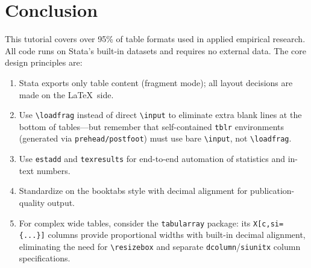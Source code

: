 \documentclass[11pt]{article}
\numberwithin{table}{section}
\begin{document}
\section{Conclusion}
This tutorial covers over 95\% of table formats used in applied empirical research. All code runs on Stata's built-in datasets and requires no external data. The core design principles are:
\begin{enumerate}
    \item Stata exports only table content (fragment mode); all layout decisions are made on the \LaTeX\ side.
    \item Use \texttt{\textbackslash loadfrag} instead of direct \texttt{\textbackslash input} to eliminate extra blank lines at the bottom of tables---but remember that self-contained \texttt{tblr} environments (generated via \texttt{prehead/postfoot}) must use bare \texttt{\textbackslash input}, not \texttt{\textbackslash loadfrag}.
    \item Use \texttt{estadd} and \texttt{texresults} for end-to-end automation of statistics and in-text numbers.
    \item Standardize on the booktabs style with decimal alignment for publication-quality output.
    \item For complex wide tables, consider the \texttt{tabularray} package: its \texttt{X[c,si=\{...\}]} columns provide proportional widths with built-in decimal alignment, eliminating the need for \texttt{\textbackslash resizebox} and separate \texttt{dcolumn}/\texttt{siunitx} column specifications.
\end{enumerate}
\end{document}
